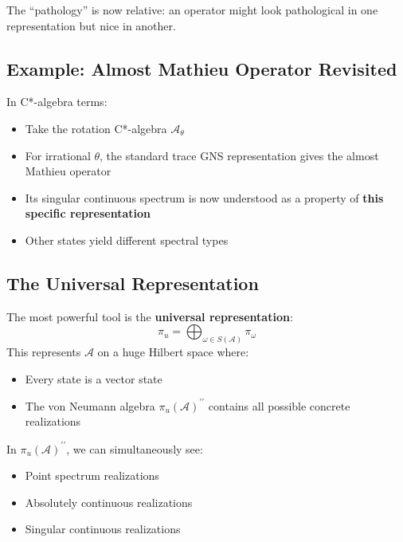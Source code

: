 \documentclass[aps,prl,reprint]{revtex4-2}
\begin{document}
The ``pathology'' is now relative: an operator might look pathological in
one representation but nice in another.

\subsection*{Example: Almost Mathieu Operator Revisited}

In C*-algebra terms:

\begin{itemize}
\item Take the rotation C*-algebra $\mathcal{A}_\theta$

\item For irrational $\theta$, the standard trace GNS representation gives
the almost Mathieu operator

\item Its singular continuous spectrum is now understood as a property of 
\textbf{this specific representation}

\item Other states yield different spectral types
\end{itemize}

\subsection*{The Universal Representation}

The most powerful tool is the \textbf{universal representation}: 
\begin{equation*}
\pi_u = \bigoplus_{\omega \in S(\mathcal{A})} \pi_\omega 
\end{equation*}
This represents $\mathcal{A}$ on a huge Hilbert space where:

\begin{itemize}
\item Every state is a vector state

\item The von Neumann algebra $\pi_u(\mathcal{A})^{\prime \prime }$ contains
all possible concrete realizations
\end{itemize}

In $\pi_u(\mathcal{A})^{\prime \prime }$, we can simultaneously see:

\begin{itemize}
\item Point spectrum realizations

\item Absolutely continuous realizations

\item Singular continuous realizations
\end{itemize}
\end{document}
